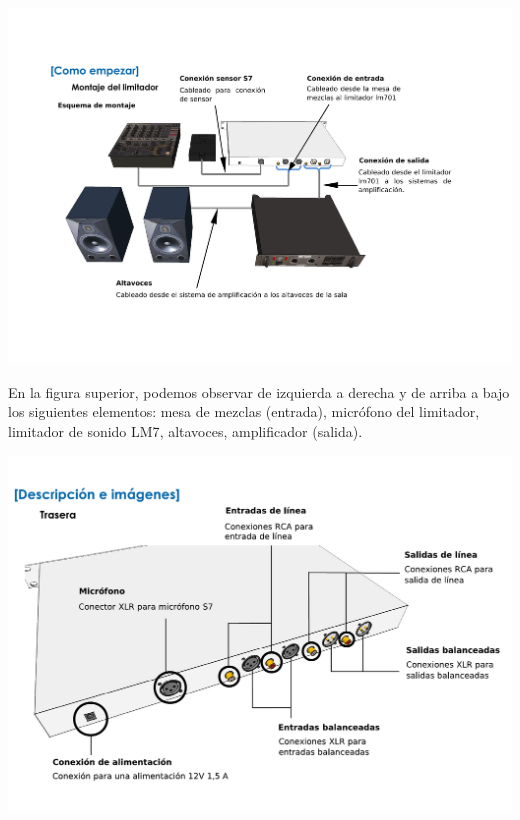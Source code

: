 
\begin{center}
    \includegraphics[scale=0.6]{figuras/manual7_montaje_trim.pdf}
    \label{fig:lm7_montaje}
\end{center}

En la figura superior, podemos observar de izquierda a derecha y de arriba a bajo los siguientes elementos: mesa de mezclas (entrada), micrófono del limitador, limitador de sonido \acrshort{LM7}, altavoces, amplificador (salida).

\begin{center}
    \includegraphics[scale=0.55]{figuras/manual7_trasera_trim.pdf}
    \label{fig:lm7_trasera}
\end{center}

